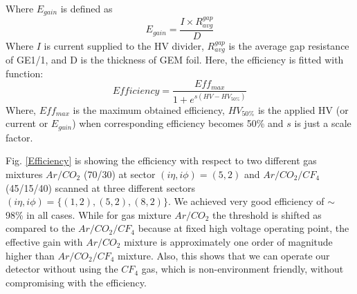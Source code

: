 Where $E_{gain}$ is defined as
\begin{equation}
E_{gain} = \frac{I\times R_{avg}^{gap}}{D}
\end{equation}
Where $I$ is current supplied to the HV divider, $R_{avg}^{gap}$ is the average gap resistance of GE1/1, and D is the thickness of GEM foil.
Here, the efficiency is fitted with function:
\begin{equation}
    Efficiency = \frac{Eff_{max}}{1+e^{s(HV-HV_{50\%})}}
\end{equation}
Where, $Eff_{max}$ is the maximum obtained efficiency, $HV_{50\%}$ is the applied HV (or current or $E_{gain}$) when corresponding efficiency becomes 50\% and $s$ is just a scale factor.

Fig. \ref{Efficiency} is showing the efficiency with respect to two different gas mixtures $Ar/CO_2$ (70/30) at sector $(i\eta,i\phi)=(5,2)$ and $Ar/CO_2/CF_4$ (45/15/40) scanned at three different sectors $(i\eta,i\phi)=\{(1,2),(5,2),(8,2)\}$. We achieved very good efficiency of $\sim$ 98\% in all cases. While for gas mixture $Ar/CO_2$ the threshold is shifted as compared to the $Ar/CO_2/CF_4$ because at fixed high voltage operating point, the effective gain with $Ar/CO_2$  mixture is approximately one order of magnitude higher than $Ar/CO_2/CF_4$ mixture. Also, this shows that we can operate our detector without using the $CF_4$ gas, which is non-environment friendly, without compromising with the efficiency.
      

